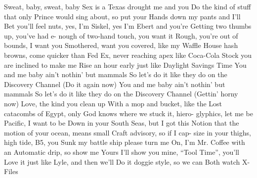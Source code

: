 
\beginverse*
{\nolyrics | \[Am] | \[C] | \[G] | \[F]}
\endverse
\beginverse
Sweat, baby, sweat, baby 
Sex is a Texas drought me and you 
Do the kind of stuff that only 
Prince would sing about, so put your 
Hands down my pants and I'll 
Bet you'll feel nuts, yes, I'm 
Siskel, yes I'm Ebert and you're 
Getting two thumbs up, you've had e-
nough of two-hand touch, you want it 
Rough, you're out of bounds, I want you 
Smothered, want you covered, like my 
Waffle House hash browns, come quicker than Fed
Ex, never reaching apex like Coca-Cola
Stock you are inclined to make me 
Rise an hour early just like 
Daylight Savings Time
\endverse
\beginchorus
You and me baby ain't nothin' but mammals
So let's do it like they do on the Discovery Channel
(Do it again now)
You and me baby ain't nothin' but mammals
So let's do it like they do on the Discovery Channel
(Gettin' horny now)
\endchorus
\beginverse
Love, the kind you clean up 
With a mop and bucket, like the 
Lost catacombs of Egypt, only 
God knows where we stuck it, hiero-
glyphics, let me be Pacific, I want to be 
Down in your South Seas, but I got this 
Notion that the motion of your ocean, means small 
Craft advisory, so if I cap-
size in your thighs, high tide, B5, you 
Sunk my battle ship please turn me 
On, I'm Mr. Coffee with an 
Automatic drip, so show me 
Yours I'll show you mine, ``Tool Time'', you'll 
Love it just like Lyle, and then we'll 
Do it doggie style, so we can 
Both watch X-Files
\endverse
{}
\endsong

